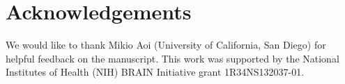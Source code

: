 \documentclass[12pt]{article}
\begin{document}
\section{Acknowledgements}
We would like to thank Mikio Aoi (University of California, San Diego) for helpful feedback on the manuscript. This work was supported by the National Institutes of Health (NIH) BRAIN Initiative grant 1R34NS132037-01.

\newpage

\bigskip

\end{document}
